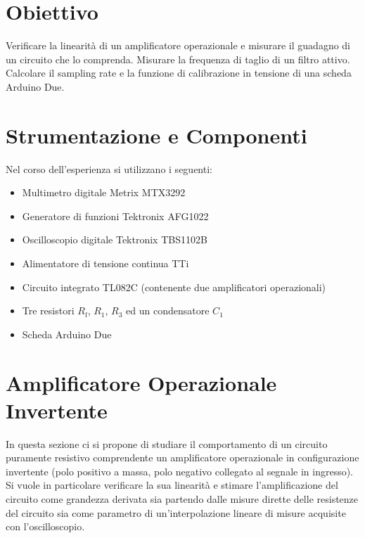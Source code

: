 \documentclass[a4paper,11pt]{article} %
\begin{document}
\section{Obiettivo}
Verificare la linearità di un amplificatore operazionale e misurare il guadagno di un circuito che lo comprenda.
Misurare la frequenza di taglio di un filtro attivo. Calcolare il sampling rate e la funzione di calibrazione in
tensione di una scheda Arduino Due.


\section{Strumentazione e Componenti}\label{s:strumenti}
Nel corso dell'esperienza si utilizzano i seguenti:
\begin{itemize}
	\item Multimetro digitale Metrix MTX3292
	\item Generatore di funzioni Tektronix AFG1022
	\item Oscilloscopio digitale Tektronix TBS1102B
	\item Alimentatore di tensione continua TTi
	\item Circuito integrato TL082C (contenente due amplificatori operazionali)
	\item Tre resistori $R_{\text{f}}$, $R_{1}$, $R_{3}$ ed un condensatore $C_{1}$ 
	\item Scheda Arduino Due
\end{itemize}



\section{Amplificatore Operazionale Invertente}\label{s:opamp} In questa sezione ci si propone di studiare il
comportamento di un circuito puramente resistivo comprendente un amplificatore operazionale in configurazione invertente
(polo positivo a massa, polo negativo collegato al segnale in ingresso). Si vuole in particolare verificare la sua
linearità e stimare l'amplificazione del circuito come grandezza derivata sia partendo dalle misure dirette delle
resistenze del circuito sia come parametro di un'interpolazione lineare di misure acquisite con l'oscilloscopio. 
\end{document}
